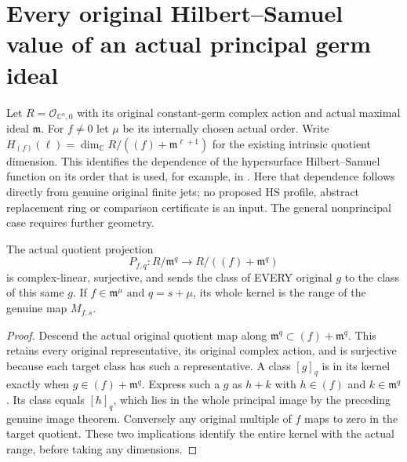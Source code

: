 \section{Every original Hilbert--Samuel value of an actual principal germ ideal}

Let $R=\mathcal O_{\mathbb C^n,0}$ with its original constant-germ complex
action and actual maximal ideal $\mathfrak m$. For $f\ne0$ let $\mu$ be
its internally chosen actual order. Write
$H_{(f)}(\ell)=\dim_{\mathbb C}R/((f)+\mathfrak m^{\ell+1})$ for the
existing intrinsic quotient dimension. This identifies the dependence of
the hypersurface Hilbert--Samuel function on its order that is used, for
example, in \cite[Example 11.15, p.~291]{bierstone-milman97-invent-math}.
Here that dependence follows directly from genuine original finite jets;
no proposed HS profile, abstract replacement ring or comparison certificate
is an input. The general nonprincipal case requires further geometry.

\begin{theorem}
\label{hir:actual-principal-jet-projection-kernel}
\leanok
{}
The actual quotient projection
\[
 P_{f,q}:R/\mathfrak m^q\longrightarrow R/((f)+\mathfrak m^q)
\]
is complex-linear, surjective, and sends the class of EVERY original $g$
to the class of this same $g$. If $f\in\mathfrak m^\mu$ and $q=s+\mu$,
its whole kernel is the range of the genuine map $M_{f,s}$.
\end{theorem}
\begin{proof}
Descend the actual original quotient map along
$\mathfrak m^q\subset(f)+\mathfrak m^q$. This retains every original
representative, its original complex action, and is surjective because
each target class has such a representative. A class $[g]_q$ is in its
kernel exactly when $g\in(f)+\mathfrak m^q$. Express such a $g$ as
$h+k$ with $h\in(f)$ and $k\in\mathfrak m^q$. Its class equals $[h]_q$,
which lies in the whole principal image by the preceding genuine image
theorem. Conversely any original multiple of $f$ maps to zero in the
target quotient. These two implications identify the entire kernel with
the actual range, before taking any dimensions.
\end{proof}

